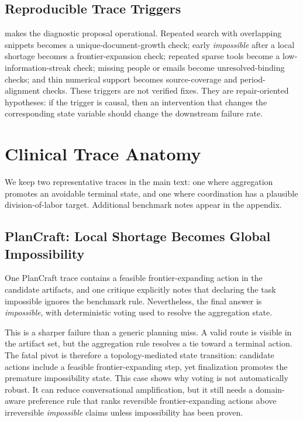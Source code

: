 \documentclass{article}
\theoremstyle{plain}
\theoremstyle{definition}
\theoremstyle{remark}
\begin{document}
\subsection{Reproducible Trace Triggers}
 makes the diagnostic proposal operational. Repeated search with overlapping snippets becomes a unique-document-growth check; early \emph{impossible} after a local shortage becomes a frontier-expansion check; repeated sparse tools become a low-information-streak check; missing people or emails become unresolved-binding checks; and thin numerical support becomes source-coverage and period-alignment checks. These triggers are not verified fixes. They are repair-oriented hypotheses: if the trigger is causal, then an intervention that changes the corresponding state variable should change the downstream failure rate.

\section{Clinical Trace Anatomy}
We keep two representative traces in the main text: one where aggregation promotes an avoidable terminal state, and one where coordination has a plausible division-of-labor target. Additional benchmark notes appear in the appendix.

\subsection{PlanCraft: Local Shortage Becomes Global Impossibility}
One PlanCraft trace contains a feasible frontier-expanding action in the candidate artifacts, and one critique explicitly notes that declaring the task impossible ignores the benchmark rule. Nevertheless, the final answer is \emph{impossible}, with deterministic voting used to resolve the aggregation state.

This is a sharper failure than a generic planning miss. A valid route is visible in the artifact set, but the aggregation rule resolves a tie toward a terminal action. The fatal pivot is therefore a topology-mediated state transition: candidate actions include a feasible frontier-expanding step, yet finalization promotes the premature impossibility state. This case shows why voting is not automatically robust. It can reduce conversational amplification, but it still needs a domain-aware preference rule that ranks reversible frontier-expanding actions above irreversible \emph{impossible} claims unless impossibility has been proven.
\end{document}
